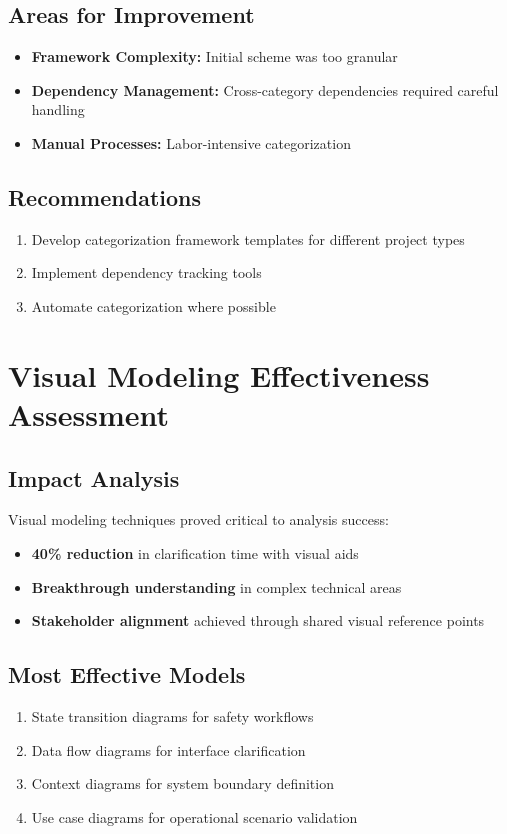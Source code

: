 \documentclass[12pt,a4paper]{article}
\begin{document}
\subsection{Areas for Improvement}
\begin{itemize}
    \item \textbf{Framework Complexity:} Initial scheme was too granular
    \item \textbf{Dependency Management:} Cross-category dependencies required careful handling
    \item \textbf{Manual Processes:} Labor-intensive categorization
\end{itemize}

\subsection{Recommendations}
\begin{enumerate}
    \item Develop categorization framework templates for different project types
    \item Implement dependency tracking tools
    \item Automate categorization where possible
\end{enumerate}

\section{Visual Modeling Effectiveness Assessment}

\subsection{Impact Analysis}
Visual modeling techniques proved critical to analysis success:
\begin{itemize}
    \item \textbf{40\% reduction} in clarification time with visual aids
    \item \textbf{Breakthrough understanding} in complex technical areas
    \item \textbf{Stakeholder alignment} achieved through shared visual reference points
\end{itemize}

\subsection{Most Effective Models}
\begin{enumerate}
    \item State transition diagrams for safety workflows
    \item Data flow diagrams for interface clarification
    \item Context diagrams for system boundary definition
    \item Use case diagrams for operational scenario validation
\end{enumerate}
\end{document}
